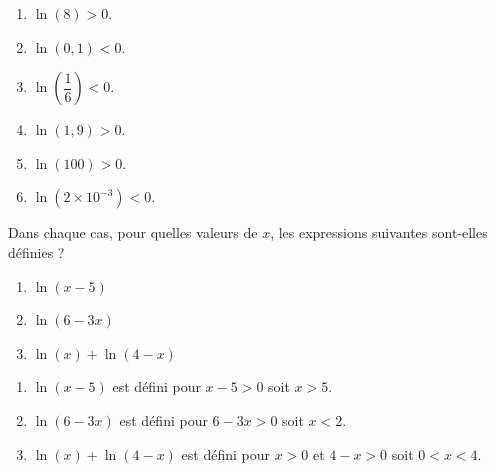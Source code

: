 \documentclass[a4paper,11pt,exos]{nsi} %
\begin{document}
\textcolor{UGLiBlue}{
    \begin{multicols}{3}
        \begin{enumerate}
            \item $\ln\left(8\right)>0$.
            \item $\ln\left(0,1\right)<0$.
            \item $\ln\left(\dfrac{1}{6}\right)<0$.
            \item $\ln\left(1,9\right)>0$.
            \item $\ln\left(100\right)>0$.
            \item $\ln\left(2\times 10^{-3}\right)<0$.
        \end{enumerate}
    \end{multicols}
}


\exo{}
Dans chaque cas, pour quelles valeurs de $x$, les expressions suivantes sont-elles définies ?
\begin{multicols}{3}
    \begin{enumerate}
        \item $\ln\left(x-5\right)$
        \item $\ln\left(6-3x\right)$
        \item $\ln\left(x\right)+\ln\left(4-x\right)$
    \end{enumerate}
\end{multicols}

\textcolor{UGLiBlue}{
        \begin{enumerate}
            \item $\ln\left(x-5\right)$ est défini pour $x-5>0$ soit $x>5$.
            \item $\ln\left(6-3x\right)$ est défini pour $6-3x>0$ soit $x<2$.
            \item $\ln\left(x\right)+\ln\left(4-x\right)$ est défini pour $x>0$ et $4-x>0$ soit $0<x<4$.
        \end{enumerate}
}

\newpage
\end{document}

